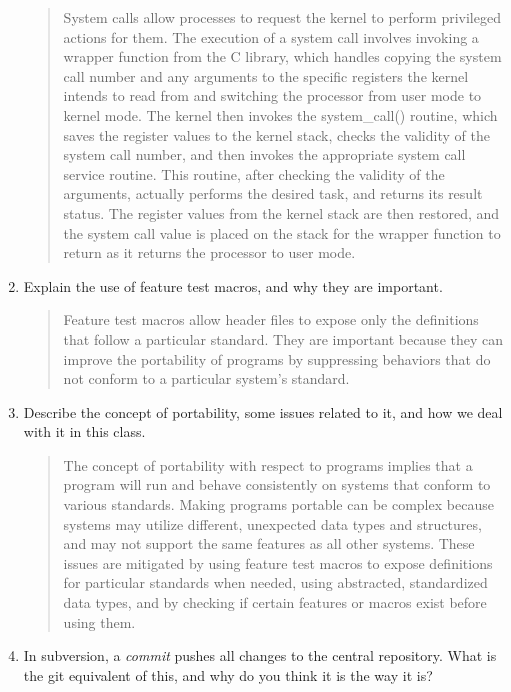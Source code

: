 \documentclass[letterpaper,10pt,onecolumn,titlepage]{article}
\begin{document}
\begin{enumerate}[itemsep=0.1 in]
\begin{quote}
System calls allow processes to request the kernel to perform privileged actions for them. The execution of a system call involves invoking a wrapper function from the C library, which handles copying the system call number and any arguments to the specific registers the kernel intends to read from and switching the processor from user mode to kernel mode.  The kernel then invokes the system\_call() routine, which saves the register values to the kernel stack, checks the validity of the system call number, and then invokes the appropriate system call service routine.  This routine, after checking the validity of the arguments, actually performs the desired task, and returns its result status.  The register values from the kernel stack are then restored, and the system call value is placed on the stack for the wrapper function to return as it returns the processor to user mode.
\end{quote}

\item Explain the use of feature test macros, and why they are important.

\begin{quote}
Feature test macros allow header files to expose only the definitions that follow a particular standard.  They are important because they can improve the portability of programs by suppressing behaviors that do not conform to a particular system's standard.
\end{quote}

\item Describe the concept of portability, some issues related to it, and how we deal
  with it in this class.

\begin{quote}
  The concept of portability with respect to programs implies that a program will run and behave consistently on systems that conform to various standards.  Making programs portable can be complex because systems may utilize different, unexpected data types and structures, and may not support the same features as all other systems.  These issues are mitigated by using feature test macros to expose definitions for particular standards when needed, using abstracted, standardized data types, and by checking if certain features or macros exist before using them.
\end{quote}

\item In subversion, a \emph{commit} pushes all changes to the central repository. What
  is the git equivalent of this, and why do you think it is the way it is?


\end{enumerate}
\end{document}
